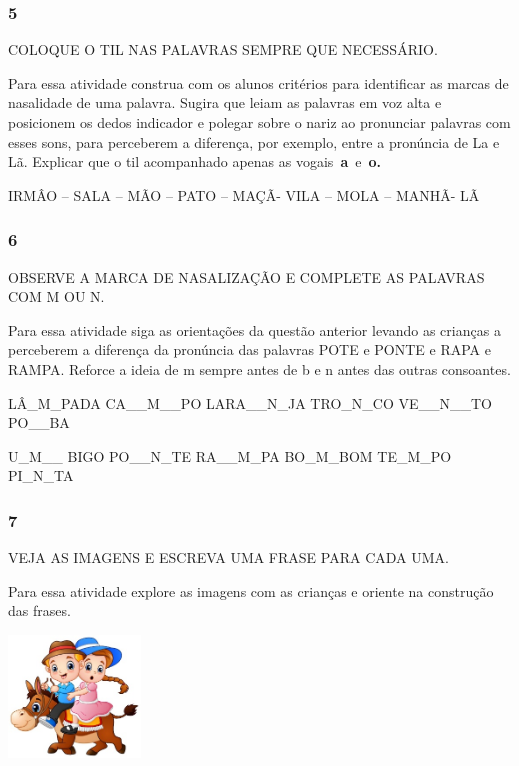 \subsubsection{5 }\label{section-19}

COLOQUE O TIL NAS PALAVRAS SEMPRE QUE NECESSÁRIO.

Para essa atividade construa com os alunos critérios para identificar as
marcas de nasalidade de uma palavra. Sugira que leiam as palavras em voz
alta e posicionem os dedos indicador e polegar sobre o nariz ao
pronunciar palavras com esses sons, para perceberem a diferença, por
exemplo, entre a pronúncia de La e Lã. Explicar que o til acompanhado
apenas as vogais~\textbf{a}~e~\textbf{o.}

IRMÂO -- SALA -- MÃO -- PATO -- MAÇÃ- VILA -- MOLA -- MANHÃ- LÃ

\subsubsection{6 }\label{section-20}

OBSERVE A MARCA DE NASALIZAÇÃO E COMPLETE AS PALAVRAS COM M OU N.

Para essa atividade siga as orientações da questão anterior levando as
crianças a perceberem a diferença da pronúncia das palavras POTE e PONTE
e RAPA e RAMPA. Reforce a ideia de m sempre antes de b e n antes das
outras consoantes.

LÂ\_M\_PADA CA\_\_M\_\_PO LARA\_\_N\_JA TRO\_N\_CO VE\_\_N\_\_TO
PO\_\_BA

U\_M\_\_ BIGO PO\_\_N\_TE RA\_\_M\_PA BO\_M\_BOM TE\_M\_PO PI\_N\_TA

\subsubsection{7 }\label{section-21}

VEJA AS IMAGENS E ESCREVA UMA FRASE PARA CADA UMA.

Para essa atividade explore as imagens com as crianças e oriente na
construção das frases.

\includegraphics[width=1.38264in,height=1.28681in]{media/image67.jpeg}

